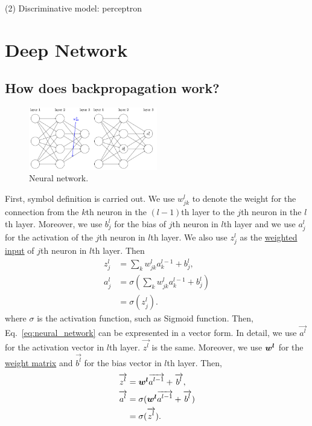 \documentclass[10pt,onecolumn]{book}
\newcommand{\bm}[1]{\mbox{\boldmath{$#1$}}}
\begin{document}
(2) Discriminative model: perceptron


\chapter{Deep Network}
\section{How does backpropagation work?}
\begin{figure}[h]
\centering
\includegraphics[width=0.5\textwidth]{figures/neural_network.png}
\caption{Neural network.}
\end{figure}
First, symbol definition is carried out. We use $w^l_{jk}$ to denote the weight for the connection from the $k$th neuron in the $(l - 1)$th layer to the $j$th neuron in the $l$th layer. Moreover, we use $b^l_j$ for the bias of $j$th neuron in $l$th layer and we use $a^l_j$ for the activation of the $j$th neuron in $l$th layer. We also use $z^l_j$ as the \uline{weighted input}  of $j$th neuron in $l$th layer. Then
\begin{equation}
\begin{split}
z^l_j & = \sum_k w^l_{jk} a^{l - 1} _ k + b^l_j, \\
a^l_j & = \sigma(\sum_k w^l_{jk} a^{l - 1} _ k + b^l_j) \\
	  & = \sigma(z^l_j).
\end{split}
\label{eq:neural_network}
\end{equation}
where $\sigma$ is the activation function, such as Sigmoid function. Then, Eq.~\ref{eq:neural_network} can be expresented in a vector form. In detail, we use $\vec{a^l}$ for the activation vector in $l$th layer. $\vec{z^l}$ is the same. Moreover, we use $\bm{w^l}$ for the \uline{weight matrix} and $\vec{b^l}$ for the bias vector in $l$th layer. Then, 
\begin{equation}
\begin{split}
\overrightarrow{z^l} & = \bm{w^l}\overrightarrow{a^{l - 1}} + \overrightarrow{b^l}, \\
\overrightarrow{a^l} & = \sigma(\bm{w^l}\overrightarrow{a^{l - 1}} + \overrightarrow{b^l}) \\
		  & = \sigma(\overrightarrow{z^l}).
\end{split}
\end{equation}
\end{document}
